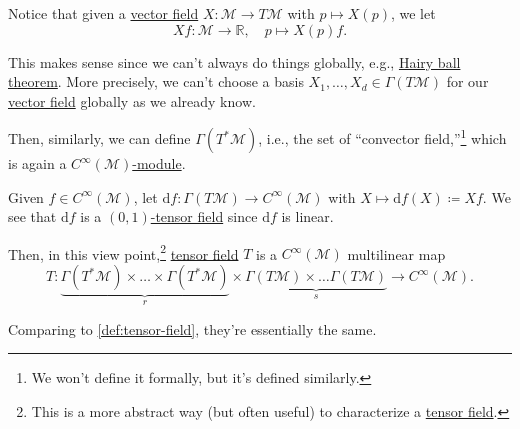 \begin{notation}
	Notice that given a \hyperref[def:vector-field]{vector field} \(X\colon \mathcal{M} \to  T \mathcal{M} \) with \(p \mapsto X(p)\), we let
	\[
		Xf\colon \mathcal{M} \to \mathbb{R} ,\quad p \mapsto X(p) f.
	\]
\end{notation}

\begin{remark}
	This makes sense since we can't always do things globally, e.g., \href{https://en.wikipedia.org/wiki/Hairy_ball_theorem}{Hairy ball theorem}. More precisely, we can't choose a basis \(X_1, \ldots , X_d\in \Gamma (T \mathcal{M} )\) for our \hyperref[def:vector-field]{vector field} globally as we already know.
\end{remark}

Then, similarly, we can define \(\Gamma (T^{\ast} \mathcal{M} )\), i.e., the set of ``convector field,''\footnote{We won't define it formally, but it's defined similarly.} which is again a \hyperref[def:module]{\(C^{\infty} (\mathcal{M} )\)-module}.

\begin{eg}
	Given \(f\in C^{\infty} (\mathcal{M} )\), let \(\mathrm{d} f \colon \Gamma (T \mathcal{M} ) \to  C^{\infty} (\mathcal{M} )\) with \(X \mapsto \mathrm{d} f(X) \coloneqq Xf\). We see that \(\mathrm{d} f\) is a \hyperref[def:tensor-field*]{\((0, 1)\)-tensor field} since \(\mathrm{d} f\) is linear.
\end{eg}

Then, in this view point,\footnote{This is a more abstract way (but often useful) to characterize a \hyperref[def:tensor-field*]{tensor field}.} \hyperref[def:tensor-field*]{tensor field} \(T\) is a \(C^{\infty} (\mathcal{M} )\) multilinear map
\[
	T \colon \underbrace{\Gamma (T ^{\ast} \mathcal{M} ) \times \ldots \times \Gamma (T ^{\ast} \mathcal{M} )}_{r} \times \underbrace{\Gamma (T \mathcal{M} ) \times \ldots \Gamma (T \mathcal{M} )}_{s} \to C^{\infty} (\mathcal{M} ).
\]

\begin{remark}
	Comparing to \autoref{def:tensor-field}, they're essentially the same.
\end{remark}